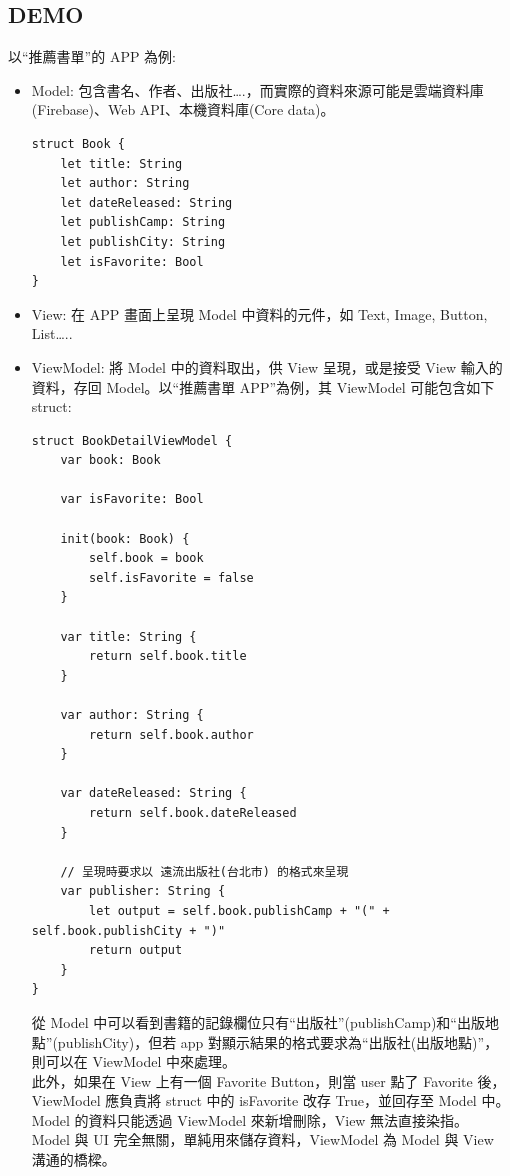 \documentclass[a4paper,12pt]{article}
\begin{document}
\subsection{DEMO}
\label{sec:orgae1834c}
以``推薦書單''的 APP 為例:\\
\begin{itemize}
\item Model: 包含書名、作者、出版社\ldots{}.，而實際的資料來源可能是雲端資料庫(Firebase)、Web API、本機資料庫(Core data)。\\
\lstset{breaklines=true,language=swift,label= ,caption= ,captionpos=b,firstnumber=1,numbers=left}
\begin{lstlisting}
struct Book {
    let title: String
    let author: String
    let dateReleased: String
    let publishCamp: String
    let publishCity: String
    let isFavorite: Bool
}
\end{lstlisting}
\item View: 在 APP 畫面上呈現 Model 中資料的元件，如 Text, Image, Button, List\ldots{}..\\
\item ViewModel: 將 Model 中的資料取出，供 View 呈現，或是接受 View 輸入的資料，存回 Model。以``推薦書單 APP''為例，其 ViewModel 可能包含如下 struct:\\
\lstset{breaklines=true,language=swift,label= ,caption= ,captionpos=b,firstnumber=1,numbers=left}
\begin{lstlisting}
struct BookDetailViewModel {
    var book: Book

    var isFavorite: Bool

    init(book: Book) {
        self.book = book
        self.isFavorite = false
    }

    var title: String {
        return self.book.title
    }

    var author: String {
        return self.book.author
    }

    var dateReleased: String {
        return self.book.dateReleased
    }

    // 呈現時要求以 遠流出版社(台北市) 的格式來呈現
    var publisher: String {
        let output = self.book.publishCamp + "(" + self.book.publishCity + ")"
        return output
    }
}
\end{lstlisting}
從 Model 中可以看到書籍的記錄欄位只有``出版社''(publishCamp)和``出版地點''(publishCity)，但若 app 對顯示結果的格式要求為``出版社(出版地點)''，則可以在 ViewModel 中來處理。\\
此外，如果在 View 上有一個 Favorite Button，則當 user 點了 Favorite 後，ViewModel 應負責將 struct 中的 isFavorite 改存 True，並回存至 Model 中。Model 的資料只能透過 ViewModel 來新增刪除，View 無法直接染指。\\
Model 與 UI 完全無關，單純用來儲存資料，ViewModel 為 Model 與 View 溝通的橋樑。\\
\end{itemize}
\end{document}
